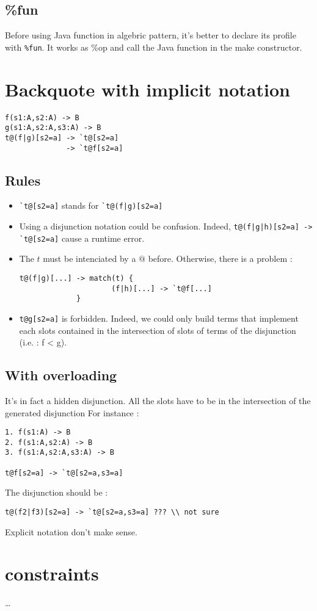 \documentclass{article}
\begin{document}
\subsection{\%fun}
Before using Java function in algebric pattern, it's better to declare its profile with \verb$%fun$. It works as \%op and call the Java function in the make constructor.

\section{Backquote with implicit notation}
\begin{verbatim}
f(s1:A,s2:A) -> B
g(s1:A,s2:A,s3:A) -> B
t@(f|g)[s2=a] -> `t@[s2=a]
              -> `t@f[s2=a]
\end{verbatim}
\subsection{Rules}
\begin{itemize}
\item \verb$`t@[s2=a]$ stands for \verb$`t@(f|g)[s2=a]$
\item Using a disjunction notation could be confusion. Indeed, \verb$t@(f|g|h)[s2=a] -> `t@[s2=a]$ cause a runtime error.
\item The $t$ must be intenciated by a $@$ before. Otherwise, there is a problem :
\begin{verbatim}
t@(f|g)[...] -> match(t) {
                     (f|h)[...] -> `t@f[...]
             }
\end{verbatim}
\item \verb$t@g[s2=a]$ is forbidden. Indeed, we could only build terms that implement each slots contained in the intersection of slots of terms of the disjunction (i.e. : f < g).
\end{itemize}
\subsection{With overloading}
It's in fact a hidden disjunction. All the slots have to be in the intersection of the generated disjunction For instance :
\begin{verbatim}
1. f(s1:A) -> B
2. f(s1:A,s2:A) -> B
3. f(s1:A,s2:A,s3:A) -> B

t@f[s2=a] -> `t@[s2=a,s3=a]
\end{verbatim}
The disjunction should be :
\begin{verbatim}
t@(f2|f3)[s2=a] -> `t@[s2=a,s3=a] ??? \\ not sure
\end{verbatim}
Explicit notation don't make sense.
\section{constraints}
\dots
\end{document}
